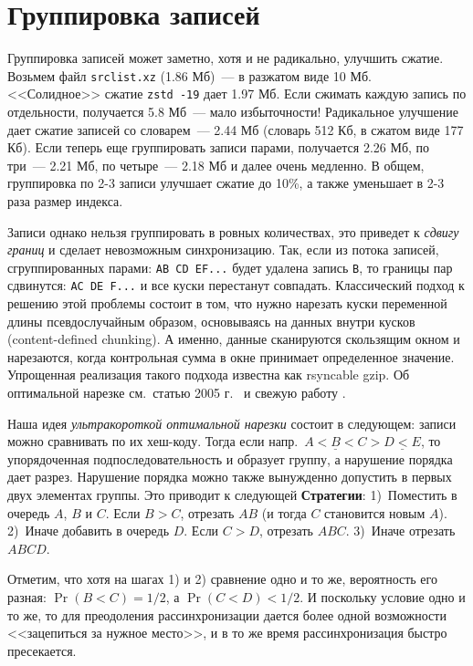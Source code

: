 \documentclass[russian,a4paper,12pt]{article}
\begin{document}
\section{Группировка записей}
Группировка записей может заметно, хотя и не радикально, улучшить сжатие.  Возьмем файл \verb|srclist.xz| (1.86 Мб)~--- в разжатом
виде 10 Мб.  <<Солидное>> сжатие \verb|zstd -19| дает 1.97 Мб.  Если сжимать каждую запись по отдельности, получается 5.8 Мб~---
мало избыточности!  Радикальное улучшение дает сжатие записей со словарем~--- 2.44 Мб (словарь 512 Кб, в сжатом виде 177 Кб).
Если теперь еще группировать записи парами, получается 2.26 Мб, по три~--- 2.21 Мб, по четыре~--- 2.18 Мб и далее очень медленно.
В общем, группировка по 2-3 записи улучшает сжатие до 10\%, а также уменьшает в 2-3 раза размер индекса.

Записи однако нельзя группировать в ровных количествах, это приведет к \textit{сдвигу границ} и сделает невозможным синхронизацию.
Так, если из потока записей, сгруппированных парами: \texttt{AB CD EF...} будет удалена запись \verb|B|, то границы пар сдвинутся:
\texttt{AC DE F...} и все куски перестанут совпадать.  Классический подход к решению этой проблемы состоит в том, что нужно
нарезать куски переменной длины псевдослучайным образом, основываясь на данных внутри кусков (content-defined chunking).
А именно, данные сканируются скользящим окном и нарезаются, когда контрольная сумма в окне принимает определенное значение.
Упрощенная реализация такого подхода известна как rsyncable gzip.  Об оптимальной нарезке см.~статью 2005 г.~\cite{hp}
и свежую работу \cite{xia}.

Наша идея \textit{ультракороткой оптимальной нарезки} состоит в следующем: записи можно сравнивать по их хеш-коду.
Тогда если напр.~$\underline{A<B<C}>\underline{D<E}$, то упорядоченная подпоследовательность и образует группу,
а нарушение порядка дает разрез.  Нарушение порядка можно также вынужденно допустить в первых двух элементах группы.
Это приводит к следующей \textbf{Стратегии}: 1)~Поместить в очередь $A$, $B$ и $C$.  Если $B>C$, отрезать $AB$ (и тогда $C$
становится новым $A$). 2)~Иначе добавить в очередь $D$.  Если $C>D$, отрезать $ABC$.  3)~Иначе отрезать $ABCD$.

Отметим, что хотя на шагах 1) и 2) сравнение одно и то же, вероятность его разная: $\Pr(B<C)=1/2$, а $\Pr(C<D)<1/2$.
И поскольку условие одно и то же, то для преодоления рассинхронизации дается более одной возможности <<зацепиться
за нужное место>>, и в то же время рассинхронизация быстро пресекается.
\end{document}
